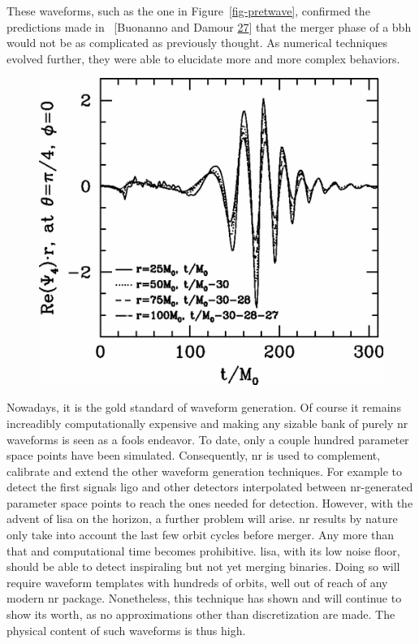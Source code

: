 \documentclass[
  11pt,
  a4paper,
  DIV=11,
  numbers=noendperiod,
  twoside]{scrreprt}
\DeclareRobustCommand{\[}{\begin{equation}}
\DeclareRobustCommand{\]}{\end{equation}}
\begin{document}
These waveforms, such as the one in Figure~\ref{fig-pretwave}, confirmed
the predictions made in ~{[}Buonanno and Damour
\protect\hyperlink{ref-Buonanno:2000ef}{27}{]} that the merger phase of
a \gls{bbh} would not be as complicated as previously thought. As
numerical techniques evolved further, they were able to elucidate more
and more complex behaviors.

\begin{figure}


{\centering \includegraphics{./pretwave.png}

}

\end{figure}

Nowadays, it is the gold standard of waveform generation. Of course it
remains increadibly computationally expensive  and making any sizable bank of purely \gls{nr} waveforms is
seen as a fools endeavor. To date, only a couple hundred parameter space
points have been simulated. Consequently, \gls{nr} is used to
complement, calibrate and extend the other waveform generation
techniques. For example to detect the first signals \gls{ligo} and other
detectors interpolated between \gls{nr}-generated parameter space points
to reach the ones needed for detection. However, with the advent of
\gls{lisa} on the horizon, a further problem will arise. \gls{nr}
results by nature only take into account the last few orbit cycles
before merger. Any more than that and computational time becomes
prohibitive. \gls{lisa}, with its low noise floor, should be able to
detect inspiraling but not yet merging binaries. Doing so will require
waveform templates with hundreds of orbits, well out of reach of any
modern \gls{nr} package. Nonetheless, this technique has shown and will
continue to show its worth, as no approximations other than
discretization are made. The physical content of such waveforms is thus
high.
\end{document}
